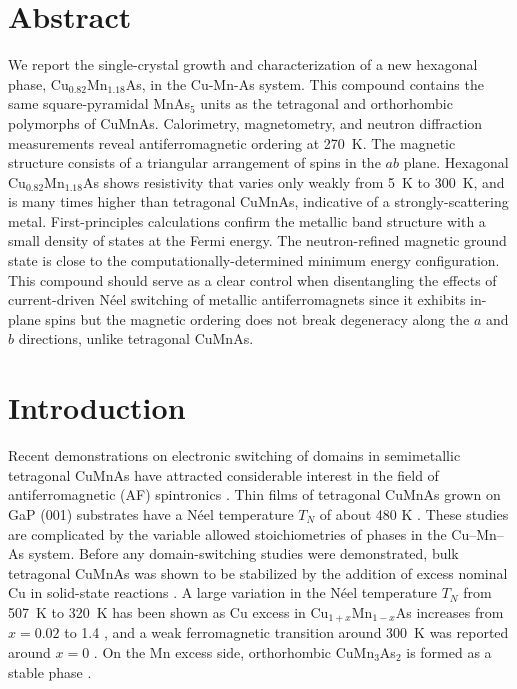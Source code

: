 \documentclass[letterpaper,10pt,doublespacing,edeposit]{uiucthesis2020}
\begin{document}
\begin{mainmatter}

\section{Abstract}
We report the single-crystal growth and characterization of a new hexagonal phase, Cu$_{0.82}$Mn$_{1.18}$As, in the Cu-Mn-As system. 
This compound contains the same square-pyramidal MnAs$_5$ units as the tetragonal and orthorhombic polymorphs of CuMnAs.
Calorimetry, magnetometry, and neutron diffraction measurements reveal antiferromagnetic ordering at 270~K.
The magnetic structure consists of a triangular arrangement of spins in the $ab$ plane. 
Hexagonal Cu$_{0.82}$Mn$_{1.18}$As shows resistivity that varies only weakly from 5~K to 300~K, and is many times higher than tetragonal CuMnAs, indicative of a strongly-scattering metal.
First-principles calculations confirm the metallic band structure with a small density of states at the Fermi energy. The neutron-refined
magnetic ground state is close to the computationally-determined minimum energy configuration. This compound should serve as a clear control when disentangling the effects of current-driven N\'{e}el switching of metallic antiferromagnets since it exhibits in-plane spins but the magnetic ordering does not break degeneracy along the $a$ and $b$ directions, unlike tetragonal CuMnAs.


\section{Introduction} 

Recent demonstrations on electronic switching of domains in  semimetallic tetragonal CuMnAs have attracted considerable interest in the field of antiferromagnetic (AF) spintronics \cite{Wadley2016,Grzybowski2017,Wadley2018,Matalla-Wagner2019}. Thin films of tetragonal CuMnAs grown on GaP (001) substrates have a N\'eel temperature $T_N$ of about 480 K \cite{Wadley2015,Hills2015}.
These studies are complicated by the variable allowed stoichiometries of  phases in the Cu--Mn--As system.
Before any domain-switching studies were demonstrated, bulk tetragonal CuMnAs was shown to be 
stabilized by the addition of excess nominal Cu in solid-state reactions \cite{Uhlirova2015}.
A large variation in the N\'{e}el temperature $T_N$ from 507~K to 320~K has been shown as Cu excess in Cu$_{1+x}$Mn$_{1-x}$As increases from $x = 0.02$ to 1.4 \cite{Uhlirova2019}, and a weak ferromagnetic transition around 300~K was reported around $x=0$ \cite{Nateprov2011}.
On the Mn excess side, orthorhombic CuMn$_3$As$_2$ is formed as a stable phase \cite{Uhlirova2015}.
 

\end{mainmatter}
\end{document}
